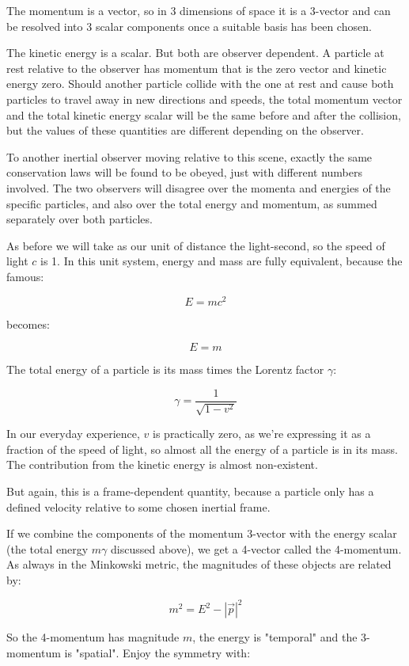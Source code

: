 The momentum is a vector, so in 3 dimensions of space it is a 3-vector and can be resolved into 3 scalar components once a suitable basis has been chosen.

The kinetic energy is a scalar. But both are observer dependent. A particle at rest relative to the observer has momentum that is the zero vector and kinetic energy zero. Should another particle collide with the one at rest and cause both particles to travel away in new directions and speeds, the total momentum vector and the total kinetic energy scalar will be the same before and after the collision, but the values of these quantities are different depending on the observer.

To another inertial observer moving relative to this scene, exactly the same conservation laws will be found to be obeyed, just with different numbers involved. The two observers will disagree over the momenta and energies of the specific particles, and also over the total energy and momentum, as summed separately over both particles.

As before we will take as our unit of distance the light-second, so the speed of light $c$ is 1. In this unit system, energy and mass are fully equivalent, because the famous:

$$E = mc^2$$

becomes:

$$E = m$$

The total energy of a particle is its mass times the Lorentz factor $\gamma$:

$$\gamma = \frac{1}{\sqrt{1-v^2}} $$

In our everyday experience, $v$ is practically zero, as we're expressing it as a fraction of the speed of light, so almost all the energy of a particle is in its mass. The contribution from the kinetic energy is almost non-existent.

But again, this is a frame-dependent quantity, because a particle only has a defined velocity relative to some chosen inertial frame.

If we combine the components of the momentum 3-vector with the energy scalar (the total energy $m\gamma$ discussed above), we get a 4-vector called the 4-momentum. As always in the Minkowski metric, the magnitudes of these objects are related by:

$$m^2 = E^2 - |\vec{p}|^2$$

So the 4-momentum has magnitude $m$, the energy is "temporal" and the 3-momentum is "spatial". Enjoy the symmetry with:

